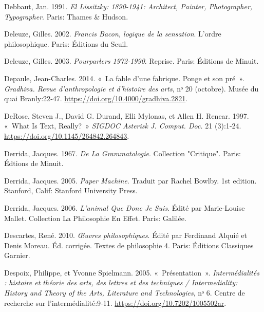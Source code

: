 \begin{CSLReferences}{1}{0}
\leavevmode{}%
Debbaut, Jan. 1991. \emph{El {Lissitzky}: 1890-1941: {Architect},
{Painter}, {Photographer}, {Typographer}}. {Paris}: {Thames \& Hudson}.

\leavevmode{}%
Deleuze, Gilles. 2002. \emph{{Francis Bacon, logique de la sensation}}.
{L'ordre philosophique}. {Paris}: {{É}ditions du Seuil}.

\leavevmode{}%
Deleuze, Gilles. 2003. \emph{{Pourparlers 1972-1990}}. {Reprise}.
{Paris}: {{É}ditions de Minuit}.

\leavevmode{}%
Depaule, Jean-Charles. 2014. {«~{La fable d'une fabrique. Ponge et son
pr{é}}~»}. \emph{Gradhiva. Revue d'anthropologie et d'histoire des
arts}, nᵒ 20 (octobre). {Mus{é}e du quai Branly}:22‑47.
\url{https://doi.org/10.4000/gradhiva.2821}.

\leavevmode{}%
DeRose, Steven J., David G. Durand, Elli Mylonas, et Allen H. Renear.
1997. {«~What {Is Text}, {Really}?~»} \emph{SIGDOC Asterisk J. Comput.
Doc.} 21 (3):1‑24. \url{https://doi.org/10.1145/264842.264843}.

\leavevmode{}%
Derrida, Jacques. 1967. \emph{De La Grammatologie}. Collection
"{Critique}". {Paris}: {{É}dtions de Minuit}.

\leavevmode{}%
Derrida, Jacques. 2005. \emph{Paper {Machine}}. Traduit par Rachel
Bowlby. 1st edition. {Stanford, Calif}: {Stanford University Press}.

\leavevmode{}%
Derrida, Jacques. 2006. \emph{L'animal Que Donc Je Suis}. Édité par
Marie-Louise Mallet. Collection {La} Philosophie En Effet. {Paris}:
{Galil{é}e}.

\leavevmode{}%
Descartes, René. 2010. \emph{{{Œ}uvres philosophiques}}. Édité par
Ferdinand Alquié et Denis Moreau. {É}d. corrig{é}e. {Textes de
philosophie} 4. {Paris}: {{É}ditions Classiques Garnier}.

\leavevmode{}%
Despoix, Philippe, et Yvonne Spielmann. 2005. {«~{Pr{é}sentation}~»}.
\emph{Interm{é}dialit{é}s : histoire et th{é}orie des arts, des lettres
et des techniques / Intermediality: History and Theory of the Arts,
Literature and Technologies}, nᵒ 6. {Centre de recherche sur
l'interm{é}dialit{é}}:9‑11. \url{https://doi.org/10.7202/1005502ar}.


\end{CSLReferences}
